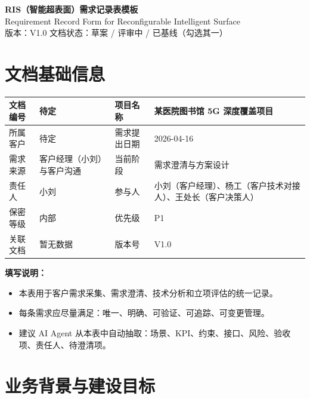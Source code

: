 \documentclass[12pt,a4paper]{ctexart}
\begin{document}
\begin{center}
    {\LARGE \bfseries RIS（智能超表面）需求记录表模板}\\[0.5em]
    {\large Requirement Record Form for Reconfigurable Intelligent Surface}\\[0.8em]
    {\small 版本：V1.0 \quad 文档状态：草案 / 评审中 / 已基线（勾选其一）}
\end{center}

\vspace{0.6em}

\section{文档基础信息}

\begin{tabularx}{\textwidth}{|P{3.2cm}|Y|P{3.2cm}|Y|}
\hline
文档编号 & 待定
 & 项目名称 & 某医院图书馆 5G 深度覆盖项目
 \\ \hline
所属客户 & 待定
 & 需求提出日期 & 2026-04-16
 \\ \hline
需求来源 & 客户经理（小刘）与客户沟通
 & 当前阶段 & 需求澄清与方案设计
 \\ \hline
责任人 & 小刘
 & 参与人 & 小刘（客户经理）、杨工（客户技术对接人）、王处长（客户决策人）
 \\ \hline
保密等级 & 内部
 & 优先级 & P1
 \\ \hline
关联文档 & 暂无数据
 & 版本号 & V1.0
 \\ \hline
\end{tabularx}

\vspace{0.8em}

\textbf{填写说明：}
\begin{itemize}[leftmargin=2em]
    \item 本表用于客户需求采集、需求澄清、技术分析和立项评估的统一记录。
    \item 每条需求应尽量满足：唯一、明确、可验证、可追踪、可变更管理。
    \item 建议 AI Agent 从本表中自动抽取：场景、KPI、约束、接口、风险、验收项、责任人、待澄清项。
\end{itemize}

\section{业务背景与建设目标}
\end{document}
